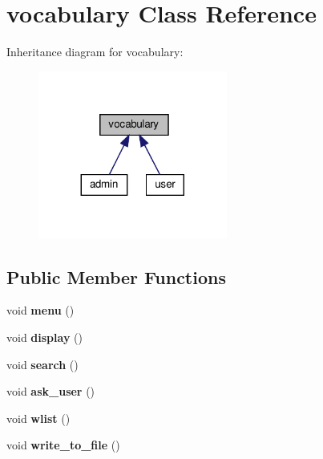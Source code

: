 \hypertarget{classvocabulary}{}\section{vocabulary Class Reference}
\label{classvocabulary}


Inheritance diagram for vocabulary\+:\nopagebreak
\begin{figure}[H]
\begin{center}
\leavevmode
\includegraphics[width=176pt]{classvocabulary__inherit__graph}
\end{center}
\end{figure}
\subsection*{Public Member Functions}
\begin{DoxyCompactItemize}
\item 
\mbox{\label{classvocabulary_a348d12570638bed537aea2267e44ad09}} 
void {\bfseries menu} ()
\item 
\mbox{\label{classvocabulary_a25130f634fe3af929adbc5b71519e4f1}} 
void {\bfseries display} ()
\item 
\mbox{\label{classvocabulary_a0a42cf17cab07d6f1be4c943899444b5}} 
void {\bfseries search} ()
\item 
\mbox{\label{classvocabulary_a4b8761df0d7fbf3851662ecbf4783d73}} 
void {\bfseries ask\+\_\+user} ()
\item 
\mbox{\label{classvocabulary_a9322b3f1fcc91bdcb863593c74c70541}} 
void {\bfseries wlist} ()
\item 
\mbox{\label{classvocabulary_a83a8451e2769db65d5cf0fe6f53f4f4b}} 
void {\bfseries write\+\_\+to\+\_\+file} ()
\end{DoxyCompactItemize}
